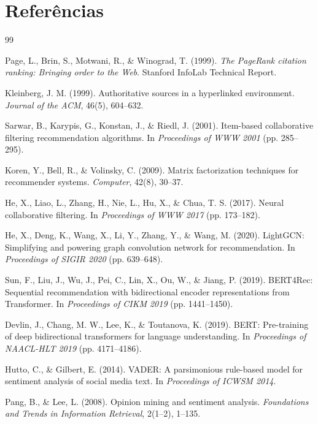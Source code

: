 \documentclass[12pt,a4paper]{article}
\begin{document}
\section{Referências}

\begin{thebibliography}{99}

 Page, L., Brin, S., Motwani, R., \& Winograd, T. (1999). \textit{The PageRank citation ranking: Bringing order to the Web}. Stanford InfoLab Technical Report.

 Kleinberg, J. M. (1999). Authoritative sources in a hyperlinked environment. \textit{Journal of the ACM}, 46(5), 604--632.

 Sarwar, B., Karypis, G., Konstan, J., \& Riedl, J. (2001). Item-based collaborative filtering recommendation algorithms. In \textit{Proceedings of WWW 2001} (pp. 285--295).

 Koren, Y., Bell, R., \& Volinsky, C. (2009). Matrix factorization techniques for recommender systems. \textit{Computer}, 42(8), 30--37.

 He, X., Liao, L., Zhang, H., Nie, L., Hu, X., \& Chua, T. S. (2017). Neural collaborative filtering. In \textit{Proceedings of WWW 2017} (pp. 173--182).

 He, X., Deng, K., Wang, X., Li, Y., Zhang, Y., \& Wang, M. (2020). LightGCN: Simplifying and powering graph convolution network for recommendation. In \textit{Proceedings of SIGIR 2020} (pp. 639--648).

 Sun, F., Liu, J., Wu, J., Pei, C., Lin, X., Ou, W., \& Jiang, P. (2019). BERT4Rec: Sequential recommendation with bidirectional encoder representations from Transformer. In \textit{Proceedings of CIKM 2019} (pp. 1441--1450).

 Devlin, J., Chang, M. W., Lee, K., \& Toutanova, K. (2019). BERT: Pre-training of deep bidirectional transformers for language understanding. In \textit{Proceedings of NAACL-HLT 2019} (pp. 4171--4186).

 Hutto, C., \& Gilbert, E. (2014). VADER: A parsimonious rule-based model for sentiment analysis of social media text. In \textit{Proceedings of ICWSM 2014}.

 Pang, B., \& Lee, L. (2008). Opinion mining and sentiment analysis. \textit{Foundations and Trends in Information Retrieval}, 2(1--2), 1--135.


\end{thebibliography}
\end{document}
